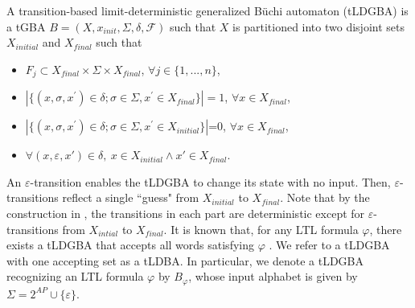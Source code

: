 \begin{definition}
  A transition-based limit-deterministic generalized B\"{u}chi automaton (tLDGBA) is a tGBA $B = (X, x_{init},\Sigma,\delta,\mathcal{F})$ such that $X$ is partitioned into two disjoint sets $X_{initial}$ and $X_{final}$ such that
  \begin{itemize}
    \item $F_j \subset X_{final} \times \Sigma \times X_{final}$, $\forall j \in \{ 1,...,n \}$,
    \item $| \{ (x, \sigma, x^{\prime}) \in \delta; \sigma \! \in \! \Sigma, x^{\prime} \in X_{final} \} | \! = \! 1$, $\forall x \! \in \! X_{final}$,
    \item $| \{ (x, \sigma, x^{\prime}) \in \delta; \sigma \! \in \! \Sigma, x^{\prime} \in X_{initial} \} |$=0, $\forall x \! \in \! X_{final}$,
    \item
    $ \forall (x, \varepsilon, x') \in \delta, \ x \in X_{initial} \land x' \in X_{final} $.
\end{itemize}
\end{definition}
  An $\varepsilon$-transition enables the tLDGBA to change its state with no input. Then, $\varepsilon$-transitions reflect a single ``guess" from $X_{initial}$ to $X_{final}$. Note that by the construction in \cite{SEJK2016}, the transitions in each part are deterministic except for $\varepsilon$-transitions from $X_{intial}$ to $X_{final}$.
It is known that, for any LTL formula $ \varphi $, there exists a tLDGBA that accepts all words satisfying $\varphi$ \cite{SEJK2016}. We refer to a tLDGBA with one accepting set as a tLDBA.
In particular, we denote a tLDGBA recognizing an LTL formula $\varphi$ by $B_{\varphi}$, whose input alphabet is given by $ \Sigma = 2^{AP} \cup \{ \varepsilon \} $.
